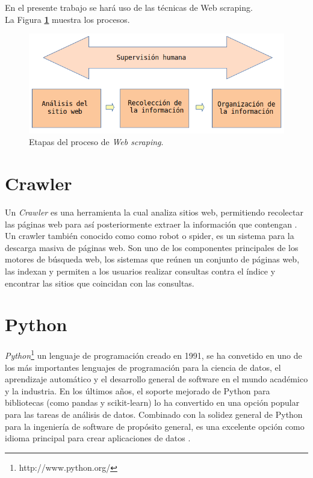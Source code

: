En el presente trabajo se hará uso de las técnicas de Web scraping.\\
La Figura \textbf{\ref{fig:procesos}} muestra los procesos.

\begin{figure}[H]
    \centering
    \includegraphics[scale=.35]{imagenes/Capitulo5/procesos}
    \caption{Etapas del proceso de \textit{Web scraping}.}
    \label{fig:procesos}
  \end{figure}
  

\section{Crawler}

Un \textit{Crawler}  es una herramienta la cual analiza sitios web, permitiendo recolectar 
las páginas web para así posteriormente extraer la información que contengan \citep{CTCrawler}. Un crawler también 
conocido como como robot o spider, es un sistema para la descarga masiva de páginas web. Son uno de 
los componentes principales de los motores de búsqueda web, los sistemas que reúnen un conjunto de 
páginas web, las indexan y permiten a los usuarios realizar consultas contra el índice y encontrar las 
sitios que coincidan con las consultas.


\section{Python}
\textit{Python}\footnote{http://www.python.org/} un lenguaje de programación creado en 1991, se ha convetido en uno de los más 
importantes lenguajes de programación para la ciencia de datos, el aprendizaje automático y el desarrollo general de software en 
el mundo académico y la industria. 
En los últimos años, el soporte mejorado de Python para bibliotecas (como pandas y scikit-learn) lo ha convertido en una opción popular 
para las tareas de análisis de datos. Combinado con la solidez general de Python para la ingeniería de software de propósito general, 
es una excelente opción como idioma principal para crear aplicaciones de datos \citep{CTPython}.

